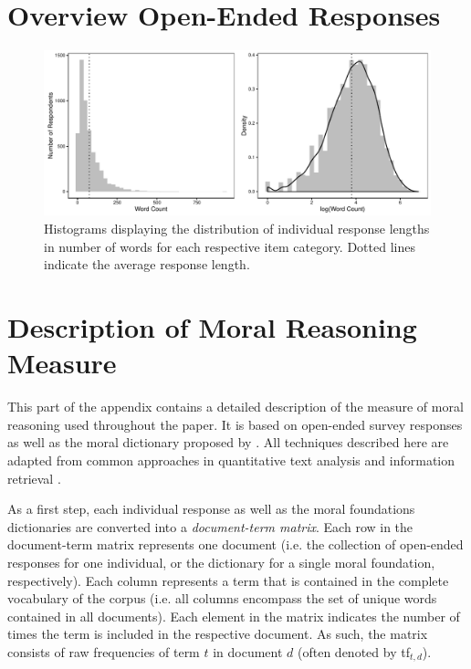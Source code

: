 \documentclass[12pt]{article}
\begin{document}
\clearpage
\section{Overview Open-Ended Responses}\label{app:oview}
\renewcommand\thefigure{\thesection.\arabic{figure}}
\renewcommand\thetable{\thesection.\arabic{table}}
\setcounter{figure}{0}
\setcounter{table}{0}



\begin{figure}[h]\centering
\includegraphics[width=\textwidth]{../calc/fig/app_wc.pdf}
\caption{Histograms displaying the distribution of individual response lengths in number of words for each respective item category. Dotted lines indicate the average response length.}\label{fig:appB2num}
\end{figure}

\clearpage
\section{Description of Moral Reasoning Measure}\label{app:measure}

This part of the appendix contains a detailed description of the measure of moral reasoning used throughout the paper. It is based on open-ended survey responses as well as the moral dictionary proposed by \citet{graham2009liberals}. All techniques described here are adapted from common approaches in quantitative text analysis and information retrieval \citep[see for exampe][for an introduction and from which much of the notation in this part of the appendix is adapted]{manning2008introduction}.

As a first step, each individual response as well as the moral foundations dictionaries are converted into a \textit{document-term matrix}. Each row in the document-term matrix represents one document (i.e. the collection of open-ended responses for one individual, or the dictionary for a single moral foundation, respectively). Each column represents a term that is contained in the complete vocabulary of the corpus (i.e. all columns encompass the set of unique words contained in all documents). Each element in the matrix indicates the number of times the term is included in the respective document. As such, the matrix consists of raw frequencies of term $t$ in document $d$ (often denoted by tf$_{t,d}$).
\end{document}
